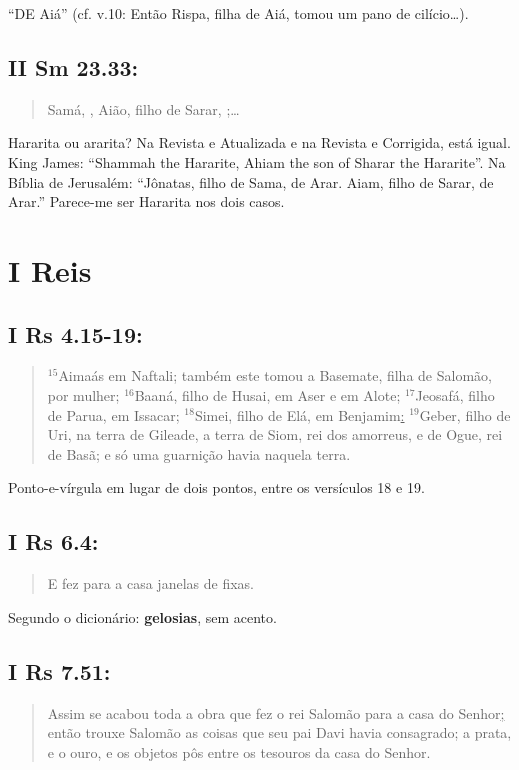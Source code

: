 ``DE Aiá'' (cf. v.10: Então Rispa, filha de Aiá, tomou um pano de cilício\ldots).


\subsection*{II Sm 23.33:} 
\begin{quote}
    \small
Samá, , Aião, filho de Sarar, ;\ldots
\end{quote}

Hararita ou ararita? Na Revista e Atualizada e na Revista e Corrigida,
está igual. King James: ``Shammah the Hararite, Ahiam the son of
Sharar the Hararite''. Na Bíblia de Jerusalém: ``Jônatas, filho de
Sama, de Arar. Aiam, filho de Sarar, de Arar.'' Parece-me ser Hararita
nos dois casos.

\section{I Reis}
\subsection*{I Rs 4.15-19:} 
\begin{quote}
    \small
$^{\mathrm{15}}$Aimaás em Naftali; também este tomou a Basemate, filha de Salomão, por mulher; $^{\mathrm{16}}$Baaná, filho de Husai, em Aser e em Alote; $^{\mathrm{17}}$Jeosafá, filho de Parua, em Issacar; $^{\mathrm{18}}$Simei, filho de Elá, em Benjamim\uline{:} $^{\mathrm{19}}$Geber, filho de Uri, na terra de Gileade, a terra de Siom, rei dos amorreus, e de Ogue, rei de Basã; e só uma guarnição havia naquela terra.
\end{quote}

Ponto-e-vírgula em lugar de dois pontos, entre os versículos 18 e 19.

\subsection*{I Rs 6.4:} 
\begin{quote}
    \small
E fez para a casa janelas de  fixas.
\end{quote}

Segundo o dicionário: \textbf{gelosias}, sem acento.

\subsection*{I Rs 7.51:} 
\begin{quote}
    \small
Assim se acabou toda a obra que fez o rei Salomão para a casa do Senhor\uline{;} então trouxe Salomão as coisas que seu pai Davi havia consagrado; a prata, e o ouro, e os objetos pôs entre os tesouros da casa do Senhor.
\end{quote}

